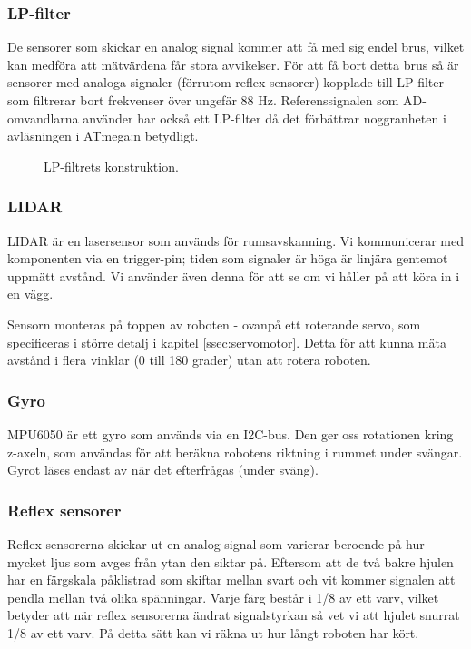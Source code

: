 \documentclass[a4paper,11pt]{article}
\begin{document}
\subsubsection{LP-filter}
De sensorer som skickar en analog signal kommer att få med sig endel brus, vilket kan medföra att mätvärdena får stora avvikelser. För att få bort detta brus så är sensorer med analoga signaler (förrutom reflex sensorer) kopplade till LP-filter som filtrerar bort frekvenser över ungefär 88 Hz. Referenssignalen som AD-omvandlarna använder har också ett LP-filter då det förbättrar noggranheten i avläsningen i ATmega:n betydligt.

\begin{figure}[h!]
	\caption{LP-filtrets konstruktion.}
	\label{fig:lpFilter}
\end{figure}

\subsubsection{LIDAR} \label{sssec:lidar}
LIDAR är en lasersensor som används för rumsavskanning. Vi kommunicerar med komponenten via en trigger-pin; tiden som signaler är höga är linjära gentemot uppmätt avstånd. Vi använder även denna för att se om vi håller på att köra in i en vägg.

Sensorn monteras på toppen av roboten - ovanpå ett roterande servo, som specificeras i större detalj i kapitel \ref{ssec:servomotor}. Detta för att kunna mäta avstånd i flera vinklar (0 till 180 grader) utan att rotera roboten.

\subsubsection{Gyro} \label{sssec:imu}
MPU6050 är ett gyro som används via en I2C-bus. Den ger oss rotationen kring z-axeln, som användas för att beräkna robotens riktning i rummet under svängar. Gyrot läses endast av när det efterfrågas (under sväng).

\subsubsection{Reflex sensorer}
Reflex sensorerna skickar ut en analog signal som varierar beroende på hur mycket ljus som avges från ytan den siktar på. Eftersom att de två bakre hjulen har en färgskala påklistrad som skiftar mellan svart och vit kommer signalen att pendla mellan två olika spänningar. Varje färg består i 1/8 av ett varv, vilket betyder att när reflex sensorerna ändrat signalstyrkan så vet vi att hjulet snurrat 1/8 av ett varv. På detta sätt kan vi räkna ut hur långt roboten har kört.
\end{document}
